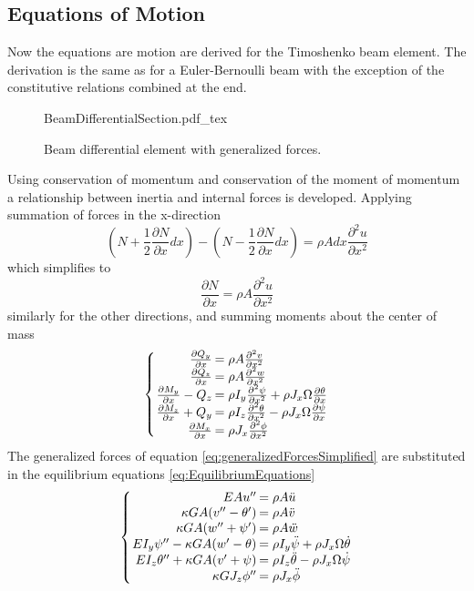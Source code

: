 \subsection{Equations of Motion}
Now the equations are motion are derived for the Timoshenko beam element. The derivation is the same as for a Euler-Bernoulli beam with the exception of the constitutive relations combined at the end.
\begin{figure}
	\centering
	\def\svgwidth{600pt}
	{BeamDifferentialSection.pdf_tex}
	\caption{Beam differential element with generalized forces.}
	\label{fig:BeamDifferentialSection}
\end{figure}
Using conservation of momentum and conservation of the moment of momentum a relationship between inertia and internal forces is developed. Applying summation of forces in the x-direction
\begin{equation}\label{key}
(N+\frac{1}{2}\frac{\partial N}{\partial x}dx)-(N-\frac{1}{2}\frac{\partial N}{\partial x}dx)=\rho A dx \frac{\partial^2u}{\partial x^2}
\end{equation}
which simplifies to
\begin{equation}\label{key}
\frac{\partial N}{\partial x}=\rho A\frac{\partial^2 u}{\partial x^2}
\end{equation}
similarly for the other directions, and summing moments about the center of mass
\begin{equation}\label{eq:EquilibriumEquations}
\left\{\arraycolsep=1pt\begin{array}{rl}
\frac{\partial Q_y}{\partial x}&=\rho A\frac{\partial^2 v}{\partial x^2}\\
\frac{\partial Q_z}{\partial x}&=\rho A\frac{\partial^2 w}{\partial x^2}\\
\frac{\partial M_y}{\partial x}-Q_z&=\rho I_y \frac{\partial^2\psi}{\partial x^2} + \rho J_x\Omega\frac{\partial\theta}{\partial x}\\
\frac{\partial M_z}{\partial x}+Q_y&=\rho I_z \frac{\partial^2\theta}{\partial x^2} - \rho J_x\Omega\frac{\partial\psi}{\partial x}\\
\frac{\partial M_x}{\partial x}&=\rho J_x\frac{\partial^2\phi}{\partial x^2}
\end{array}\right.
\end{equation}
The generalized forces of equation \ref{eq:generalizedForcesSimplified} are substituted in the equilibrium equations \ref{eq:EquilibriumEquations}
\begin{equation}\label{eq:EquationsOfMotionIndependent}
\left\{\arraycolsep=1pt\begin{array}{rl}
EAu''&=\rho A\ddot{u}\\
\kappa GA(v''-\theta')&=\rho A\ddot{v}\\
\kappa GA(w''+\psi')&=\rho A\ddot{w}\\
EI_y\psi''-\kappa GA(w'-\theta)&=\rho I_y\ddot{\psi}+\rho J_x\Omega\dot{\theta}\\
EI_z\theta''+\kappa GA(v'+\psi)&=\rho I_z\ddot{\theta}-\rho J_x\Omega\dot{\psi}\\
\kappa GJ_z\phi''&=\rho J_x\ddot{\phi}
\end{array}\right.
\end{equation}
